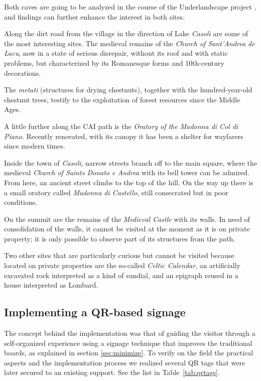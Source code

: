\documentclass[sustainability,article,submit,pdftex,moreauthors]{Definitions/mdpi}
\begin{document}
Both caves are going to be analyzed in the course of the Underlandscape project \cite{Underlandscape}, and findings can further enhance the interest in both sites.

Along the dirt road from the village in the direction of Lake \emph{Casoli} are some of the most interesting sites. The medieval remains of the {\em Church of Sant'Andrea de Lacu}, now in a state of serious disrepair, without its roof and with static problems, but characterized by its Romanesque forms and 10th-century decorations. 

The \emph{metati} (structures for drying chestnuts), together with the hundred-year-old chestnut trees, testify to the exploitation of forest resources since the Middle Ages. 

A little further along the CAI path is the {\em Oratory of the Madonna di Col di Piano}. Recently renovated, with its canopy it has been a shelter for wayfarers since modern times.

Inside the town of \emph{Casoli}, narrow streets branch off to the main square, where the medieval {\em Church of Saints Donato e Andrea} with its bell tower can be admired. From here, an ancient street climbs to the top of the hill. On the way up there is a small oratory called {\em Madonna di Castello}, still consecrated but in poor conditions. 

On the summit are the remains of the {\em Medieval Castle} with its walls. In need of consolidation of the walls, it cannot be visited at the moment as it is on private property; it is only possible to observe part of its structures from the path. 

Two other sites that are particularly curious but cannot be visited because located on private properties are the so-called  {\em Celtic Calendar}, an artificially excavated rock interpreted as a kind of sundial, and an epigraph reused in a house interpreted as Lombard.

\subsection{Implementing a QR-based signage}

The concept behind the implementation was that of guiding the visitor through a self-organized experience using a signage technique that improves the traditional boards, as explained in section \ref{sec:minimize}. To verify on the field the practical aspects and the implementation process we realized several QR tags that were later secured to an existing support. See the list in Table~\ref{tab:qrtags}.
\end{document}
